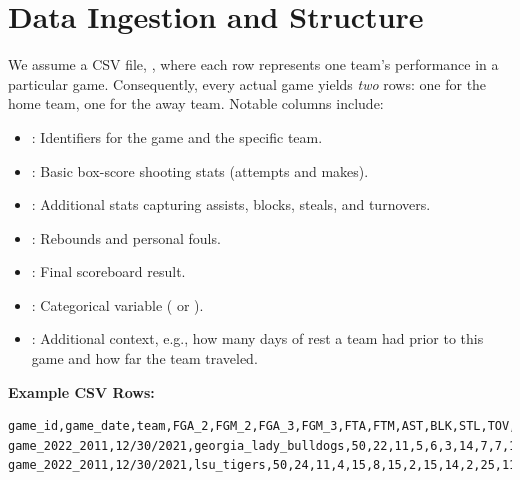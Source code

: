 \documentclass[12pt]{article}
\begin{document}
\section{Data Ingestion and Structure}
We assume a CSV file, , where each row represents one team's performance in a particular game. Consequently, every actual game yields \emph{two} rows: one for the home team, one for the away team. Notable columns include:

\begin{itemize}[noitemsep]
    \item {}: Identifiers for the game and the specific team.
    \item {}: Basic box-score shooting stats (attempts and makes).
    \item {}: Additional stats capturing assists, blocks, steals, and turnovers.
    \item {}: Rebounds and personal fouls.
    \item {}: Final scoreboard result.
    \item {}: Categorical variable ( or ).
    \item {}: Additional context, e.g., how many days of rest a team had prior to this game and how far the team traveled.
\end{itemize}

\noindent
\textbf{Example CSV Rows:}
\begin{verbatim}
game_id,game_date,team,FGA_2,FGM_2,FGA_3,FGM_3,FTA,FTM,AST,BLK,STL,TOV,TOV_team,DREB,OREB,F_tech,F_personal,team_score,opponent_team_score,largest_lead,notD1_incomplete,OT_length_min_tot,rest_days,attendance,tz_dif_H_E,prev_game_dist,home_away,home_away_NS,travel_dist
game_2022_2011,12/30/2021,georgia_lady_bulldogs,50,22,11,5,6,3,14,7,7,18,0,25,11,0,18,62,68,1.0,False,,9.0,3241.0,0.0,0.0,home,1,0.0
game_2022_2011,12/30/2021,lsu_tigers,50,24,11,4,15,8,15,2,15,14,2,25,11,0,7,68,62,14.0,False,,3.0,3241.0,0.0,824.0,away,-1,824.0
\end{verbatim}
\end{document}

